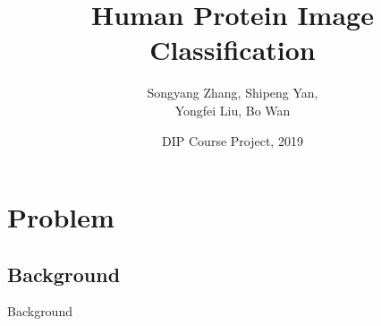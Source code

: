 \documentclass[unknownkeysallowed]{beamer}
\title{Human Protein Image Classification}
\author[S.Y.Zhang\quad S.P.Yan\quad Y.F.Liu\quad B.Wan\qquad]{Songyang Zhang, Shipeng Yan,\\ Yongfei Liu, Bo Wan}
\institute
{
	School of Information Science and Technology \\
	ShanghaiTech University
}
\date{DIP Course Project, 2019}
\begin{document}
	\begin{frame}
		\titlepage
	\end{frame}
	
	\begin{frame}
		\tableofcontents
	\end{frame}
	
 	\section{Problem}
	\subsection{Background}
	\begin{frame}{Background}
	

\end{frame}
\end{document}
